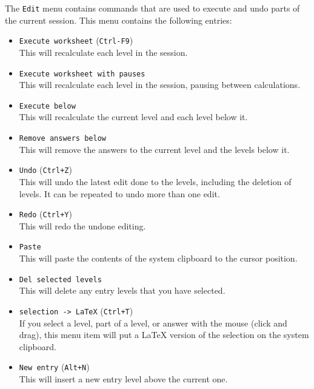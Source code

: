 \documentclass[a4paper,11pt]{book}
\begin{document}
The \texttt{Edit} menu contains commands that are used to execute and
undo parts of the current session.  This menu contains the following
entries:
\begin{itemize}
  \item \texttt{Execute worksheet} (\texttt{Ctrl-F9})\\
  This will recalculate each level in the session.

  \item \texttt{Execute worksheet with pauses}\\
  This will recalculate each level in the session, pausing between
  calculations. 

  \item \texttt{Execute below}\\
  This will recalculate the current level and each level below it.

  \item \texttt{Remove answers below}\\
  This will remove the answers to the current level and the levels
  below it.

  \item \texttt{Undo} (\texttt{Ctrl+Z})\\
  This will undo the latest edit done to the levels, including the
  deletion of levels.  It can be repeated to undo more than one edit.

  \item \texttt{Redo} (\texttt{Ctrl+Y})\\
  This will redo the undone editing.

  \item \texttt{Paste}\\
  This will paste the contents of the system clipboard to the cursor
  position.

  \item \texttt{Del selected levels}\\
  This will delete any entry levels that you have selected.

  \item \texttt{selection -> LaTeX} (\texttt{Ctrl+T})\\
  If you select a level, part of a level, or answer with the mouse
  (click and drag), this menu item will put a \LaTeX{} version of the
  selection on the system clipboard.

  \item \texttt{New entry} (\texttt{Alt+N})\\
  This will insert a new entry level above the current one.


\end{itemize}
\end{document}

